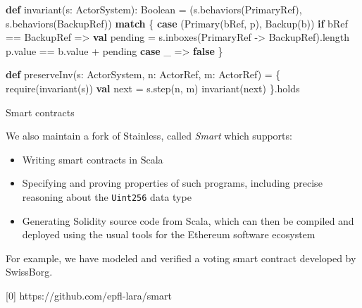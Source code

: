 \documentclass[
  ignorenonframetext,
]{beamer}
\newenvironment{Shaded}{}{}
\newcommand{\FunctionTok}[1]{\textcolor[rgb]{0.02,0.16,0.49}{#1}}
\newcommand{\KeywordTok}[1]{\textcolor[rgb]{0.00,0.44,0.13}{\textbf{#1}}}
\newcommand{\NormalTok}[1]{#1}
\providecommand{\tightlist}{%
  \setlength{\itemsep}{0pt}\setlength{\parskip}{0pt}}
\begin{document}
\begin{frame}[fragile]

\begin{Shaded}
\begin{Highlighting}[]
\KeywordTok{def} \FunctionTok{invariant}\NormalTok{(s: ActorSystem): Boolean =}
\NormalTok{  (s.}\FunctionTok{behaviors}\NormalTok{(PrimaryRef), s.}\FunctionTok{behaviors}\NormalTok{(BackupRef)) }\KeywordTok{match}\NormalTok{ \{}
    \KeywordTok{case}\NormalTok{ (}\FunctionTok{Primary}\NormalTok{(bRef, p), }\FunctionTok{Backup}\NormalTok{(b)) }\KeywordTok{if}\NormalTok{ bRef == BackupRef =>}
      \KeywordTok{val}\NormalTok{ pending = s.}\FunctionTok{inboxes}\NormalTok{(PrimaryRef -> BackupRef).}\FunctionTok{length}
\NormalTok{      p.}\FunctionTok{value}\NormalTok{ == b.}\FunctionTok{value}\NormalTok{ + pending}
    \KeywordTok{case}\NormalTok{ _ => }\KeywordTok{false}
\NormalTok{  \}}
\end{Highlighting}
\end{Shaded}

\end{frame}

\begin{frame}[fragile]

\begin{Shaded}
\begin{Highlighting}[]
\KeywordTok{def} \FunctionTok{preserveInv}\NormalTok{(s: ActorSystem, n: ActorRef, m: ActorRef) = \{}
  \FunctionTok{require}\NormalTok{(}\FunctionTok{invariant}\NormalTok{(s))}
  \KeywordTok{val}\NormalTok{ next = s.}\FunctionTok{step}\NormalTok{(n, m)}
  \FunctionTok{invariant}\NormalTok{(next)}
\NormalTok{\}.}\FunctionTok{holds}
\end{Highlighting}
\end{Shaded}

\end{frame}

\begin{frame}[fragile]

\begin{block}{Smart contracts}

We also maintain a fork of Stainless, called \emph{Smart} which
supports:

\begin{itemize}
\tightlist
\item
  Writing smart contracts in Scala
\item
  Specifying and proving properties of such programs, including precise
  reasoning about the \texttt{Uint256} data type
\item
  Generating Solidity source code from Scala, which can then be compiled
  and deployed using the usual tools for the Ethereum software ecosystem
\end{itemize}

For example, we have modeled and verified a voting smart contract
developed by SwissBorg.

{[}0{]} https://github.com/epfl-lara/smart

\end{block}

\end{frame}
\end{document}
